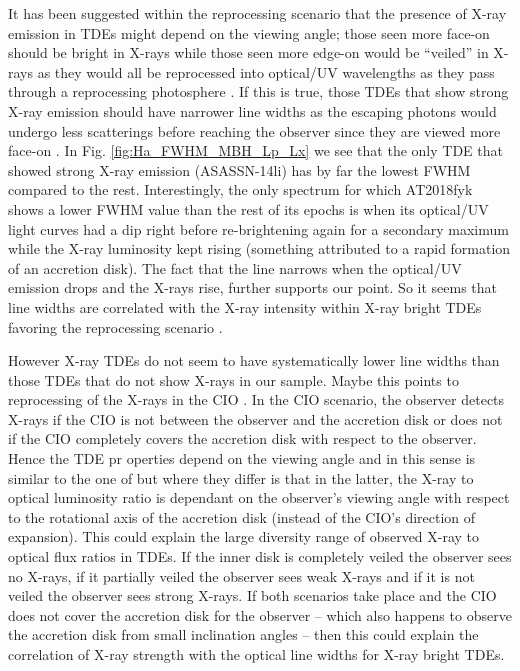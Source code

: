 \documentclass[structabstract]{aa}
\begin{document}
It has been suggested within the reprocessing scenario \citep{Dai2018} that the presence of X-ray emission in TDEs might depend on the viewing angle; those seen more face-on should be bright in X-rays while those seen more edge-on would be ``veiled'' in X-rays as they would all be reprocessed into optical/UV wavelengths as they pass through a reprocessing photosphere \citep[e.g.,][]{Auchettl2017}. If this is true, those TDEs that show strong X-ray emission should have narrower line widths as the escaping photons would undergo less scatterings before reaching the observer since they are viewed more face-on \citep{Leloudas2019}. In Fig. \ref{fig:Ha_FWHM_MBH_Lp_Lx} we see that the only TDE that showed strong X-ray emission (ASASSN-14li) has by far the lowest FWHM compared to the rest. Interestingly, the only spectrum for which AT2018fyk shows a lower FWHM value than the rest of its epochs is when its optical/UV light curves had a dip right before re-brightening again for a secondary maximum while the X-ray luminosity kept rising (something attributed to a rapid formation of an accretion disk). The fact that the line narrows when the optical/UV emission drops and the X-rays rise, further supports our point. So it seems that line widths are correlated with the X-ray intensity within X-ray bright TDEs favoring the reprocessing scenario \citep{Dai2018}. 

However X-ray TDEs do not seem to have systematically lower line widths than those TDEs that do not show X-rays in our sample. Maybe this points to reprocessing of the X-rays in the CIO \citep{Lu2020}. In the CIO scenario, the observer detects X-rays if the CIO is not between the observer and the accretion disk or does not if the CIO completely covers the accretion disk with respect to the observer. Hence the TDE pr  operties depend on the viewing angle and in this sense is similar to the one of \citet{Dai2018} but where they differ is that in the latter, the X-ray to optical luminosity ratio is dependant on the observer’s viewing angle with respect to the rotational axis of the accretion disk (instead of the CIO’s direction of expansion). This could explain the large diversity range of observed X-ray to optical flux ratios in TDEs. If the inner disk is completely veiled the observer sees no X-rays, if it partially veiled the observer sees weak X-rays and if it is not veiled the observer sees strong X-rays.
If both scenarios take place and the CIO does not cover the accretion disk for the observer -- which also happens to observe the accretion disk from small inclination angles -- then this could explain the correlation of X-ray strength with the optical line widths for X-ray bright TDEs.
\end{document}
